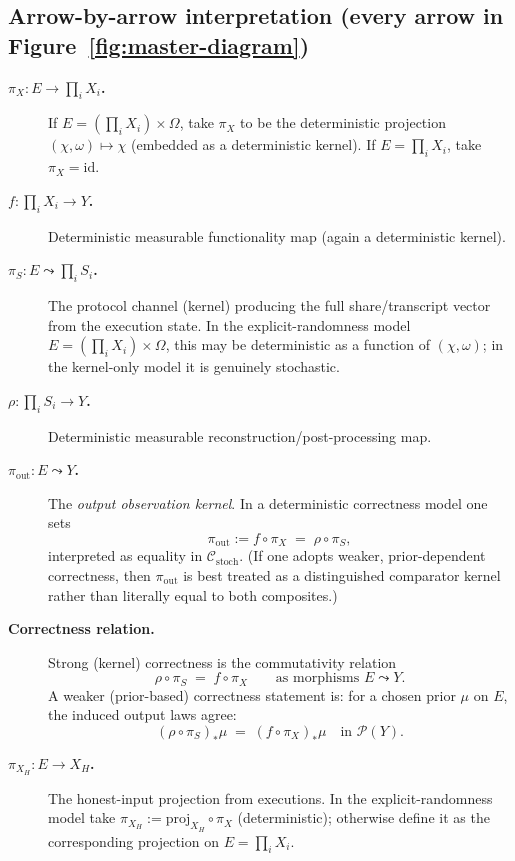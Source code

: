\documentclass[11pt,a4paper]{article}
\theoremstyle{definition}
\theoremstyle{plain}
\newcommand{\Prob}{\mathcal{P}}
\begin{document}
\subsection{Arrow-by-arrow interpretation (every arrow in Figure~\ref{fig:master-diagram})}
\begin{description}
    \item[\textbf{$\pi_X:E\to \prod_i X_i$.}]
    If $E=(\prod_i X_i)\times \Omega$, take $\pi_X$ to be the deterministic projection $(\chi,\omega)\mapsto \chi$ (embedded as a deterministic kernel).
    If $E=\prod_i X_i$, take $\pi_X=\mathrm{id}$.

    \item[\textbf{$f:\prod_i X_i\to Y$.}]
    Deterministic measurable functionality map (again a deterministic kernel).

    \item[\textbf{$\pi_S:E\leadsto \prod_i S_i$.}]
    The protocol channel (kernel) producing the full share/transcript vector from the execution state.
    In the explicit-randomness model $E=(\prod_i X_i)\times\Omega$, this may be deterministic as a function of $(\chi,\omega)$; in the kernel-only model it is genuinely stochastic.

    \item[\textbf{$\rho:\prod_i S_i\to Y$.}]
    Deterministic measurable reconstruction/post-processing map.

    \item[\textbf{$\pi_{\mathrm{out}}:E\leadsto Y$.}]
    The \emph{output observation kernel}. In a deterministic correctness model one sets
    \[
    \pi_{\mathrm{out}} := f\circ \pi_X \;=\; \rho\circ \pi_S,
    \]
    interpreted as equality in $\mathcal{C}_{\mathrm{stoch}}$.
    (If one adopts weaker, prior-dependent correctness, then $\pi_{\mathrm{out}}$ is best treated as a distinguished comparator kernel rather than literally equal to both composites.)

    \item[\textbf{Correctness relation.}]
    Strong (kernel) correctness is the commutativity relation
    \[
    \rho\circ \pi_S \;=\; f\circ \pi_X \qquad \text{as morphisms } E\leadsto Y.
    \]
    A weaker (prior-based) correctness statement is: for a chosen prior $\mu$ on $E$, the induced output laws agree:
    \[
    (\rho\circ \pi_S)_*\mu \;=\; (f\circ \pi_X)_*\mu \quad \text{in }\Prob(Y).
    \]

    \item[\textbf{$\pi_{X_H}:E\to X_H$.}]
    The honest-input projection from executions. In the explicit-randomness model take
    $\pi_{X_H}:=\mathrm{proj}_{X_H}\circ \pi_X$ (deterministic); otherwise define it as the corresponding projection on $E=\prod_i X_i$.


\end{description}
\end{document}
